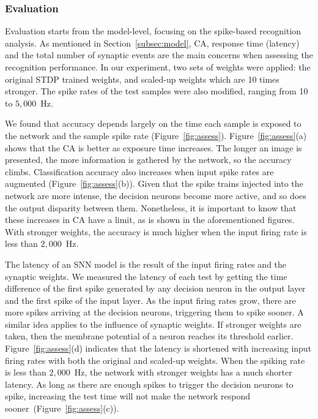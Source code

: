 \documentclass{frontiersENG} %
\begin{document}
\subsubsection{Evaluation}
Evaluation starts from the model-level, focusing on the spike-based recognition analysis.
As mentioned in Section~\ref{subsec:model}, CA, response time (latency) and the total number of synaptic events are the main concerns when assessing the recognition performance.
In our experiment, two sets of weights were applied: the original STDP trained weights, and scaled-up weights which are 10 times stronger.
The spike rates of the test samples were also modified, ranging from 10 to $5,000$~Hz.

We found that accuracy depends largely on the time each sample is exposed to the network and the sample spike rate (Figure~\ref{fig:assess}).
Figure~\ref{fig:assess}(a) shows that the CA is better as exposure time increases. The longer an image is presented, the more information is gathered by the network, so the accuracy climbs.
Classification accuracy also increases when input spike rates are augmented (Figure~\ref{fig:assess}(b)).
Given that the spike trains injected into the network are more intense, the decision neurons become more active, and so does the output disparity between them.
Nonetheless, it is important to know that these increases in CA have a limit, as is shown in the aforementioned figures.
With stronger weights, the accuracy is much higher when the input firing rate is less than $2,000$~Hz.


The latency of an SNN model is the result of the input firing rates and the synaptic weights.
We measured the latency of each test by getting the time difference of the first spike generated by any decision neuron in the output layer and the first spike of the input layer.
As the input firing rates grow, there are more spikes arriving at the decision neurons, triggering them to spike sooner.
A similar idea applies to the influence of synaptic weights.
If stronger weights are taken, then the membrane potential of a neuron reaches its threshold earlier.
Figure~\ref{fig:assess}(d) indicates that the latency is shortened with increasing input firing rates with both the original and scaled-up weights.
When the spiking rate is less than $2,000$~Hz, the network with stronger weights has a much shorter latency.
As long as there are enough spikes to trigger the decision neurons to spike, increasing the test time will not make the network respond sooner~(Figure~\ref{fig:assess}(c)).
\end{document}
